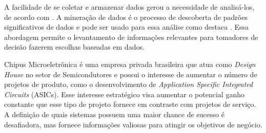 \documentclass[conference,compsoc]{IEEEtran}
\begin{document}
%
A facilidade de se coletar e armazenar dados gerou a necessidade de analisá-los, de acordo com \citet{han_data_2011}. A mineração de dados é o processo de descoberta de padrões significativos de dados e pode ser usado para essa análise como destaca \citet{witten_data_2005}. Essa abordagem permite o levantamento de informações relevantes para tomadores de decisão fazerem escolhas baseadas em dados.

Chipus Microeletrônica é uma empresa privada brasileira que atua como \textit{Design House} no setor de Semicondutores e possui o interesse de aumentar o número de projetos de produto, como o desenvolvimento de \textit{Application Specific Integrated Circuits} (ASICs). Esse interesse estratégico visa aumentar o potencial ganho constante que esse tipo de projeto fornece em contraste com projetos de serviço. A definição de quais sistemas possuem uma maior chance de sucesso é desafiadora, mas fornece informações valiosas para atingir os objetivos de negócio.
\end{document}
